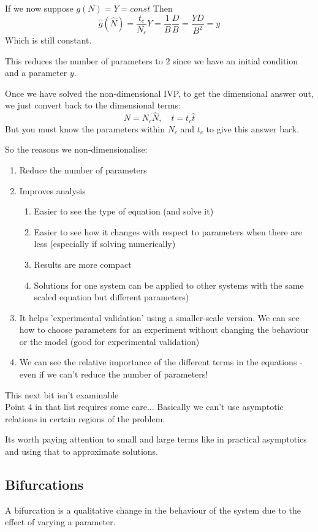 \documentclass{X:/Documents/Coding/Latex/myassignment}
\begin{document}
If we now suppose $g(N) = Y = const$
Then
\[\hat{g}(\hat{N}) = \frac{t_c}{N_c} Y = \frac1B \frac DB = \frac{YD}{B^2} = y\]
Which is still constant.


This reduces the number of parameters to $2$ since we have an initial condition and a parameter $y$.

Once we have solved the non-dimensional IVP, to get the dimensional answer out, we just convert back to the dimensional terms:
\[N = N_c \hat{N},\quad t=t_c \hat{t}\]
But you must know the parameters within $N_c$ and $t_c$ to give this answer back.

So the reasons we non-dimensionalise:
\begin{enumerate}
    \item Reduce the number of parameters
    \item Improves analysis
    \begin{enumerate}
        \item Easier to see the type of equation (and solve it)
        \item Easier to see how it changes with respect to parameters when there are less (especially if solving numerically)
        \item Results are more compact
        \item Solutions for one system can be applied to other systems with the same scaled equation but different parameters)
    \end{enumerate}
    \item It helps 'experimental validation' using a smaller-scale version. We can see how to choose parameters for an experiment without changing the behaviour or the model (good for experimental validation)
    \item We can see the relative importance of the different terms in the equations - even if we can't reduce the number of parameters!
\end{enumerate}

This next bit isn't examinable\\
Point $4$ in that list requires some care... 
Basically we can't use asymptotic relations in certain regions of the problem.


Its worth paying attention to small and large terms like in practical asymptotics and using that to approximate solutions.


\subsection{Bifurcations}
A bifurcation is a qualitative change in the behaviour of the system due to the effect of varying a parameter.
\end{document}
